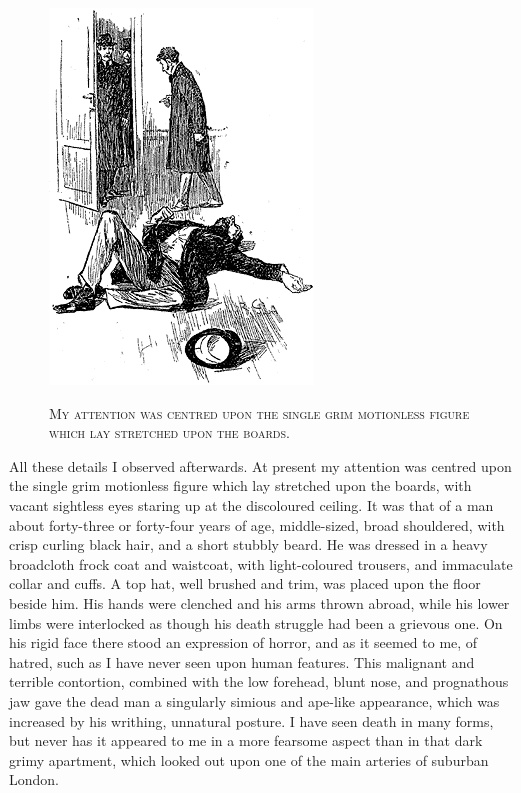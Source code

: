 \documentclass[12pt,english,oneside]{book}
\newcommand{\noun}[1]{\textsc{#1}}
\begin{document}
%
\begin{figure}[htbp]
\noindent \begin{center}\includegraphics{images/study10-stud-05.png}\end{center}

\noindent \begin{center}\noun{My attention was centred upon the
single grim motionless figure which lay stretched upon the boards.}\end{center}
\end{figure}
All these details I observed afterwards. At present my attention was
centred upon the single grim motionless figure which lay stretched
upon the boards, with vacant sightless eyes staring up at the discoloured
ceiling. It was that of a man about forty-three or forty-four years
of age, middle-sized, broad shouldered, with crisp curling black hair,
and a short stubbly beard. He was dressed in a heavy broadcloth frock
coat and waistcoat, with light-coloured trousers, and immaculate collar
and cuffs. A top hat, well brushed and trim, was placed upon the floor
beside him. His hands were clenched and his arms thrown abroad, while
his lower limbs were interlocked as though his death struggle had
been a grievous one. On his rigid face there stood an expression of
horror, and as it seemed to me, of hatred, such as I have never seen
upon human features. This malignant and terrible contortion, combined
with the low forehead, blunt nose, and prognathous jaw gave the dead
man a singularly simious and ape-like appearance, which was increased
by his writhing, unnatural posture. I have seen death in many forms,
but never has it appeared to me in a more fearsome aspect than in
that dark grimy apartment, which looked out upon one of the main arteries
of suburban London.
\end{document}
